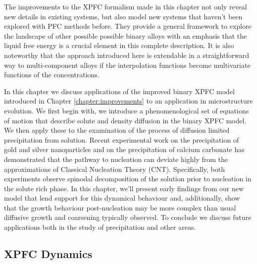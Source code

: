\documentclass[showkeys, prb, reprint]{revtex4-1}
\begin{document}
The improvements to the XPFC formalism made in this chapter not only reveal new
details in existing systems, but also model new systems that haven't been
explored with PFC methods before. They provide a general framework to explore
the landscape of other possible possible binary alloys with an emphasis that
the liquid free energy is a crucial element in this complete description. It is
also noteworthy that the approach introduced here is extendable in a
straightforward way to multi-component alloys if the interpolation functions
become multivariate functions of the concentrations.

In this chapter we discuss applications of the improved binary XPFC model
introduced in Chapter \ref{chapter:improvements} to an application in
microstructure evolution.  We first begin with, we introduce  a
phenomenological set of equations of motion that describe solute and density
diffusion in the binary XPFC model. We then apply these to the examination of
the process of diffusion limited precipitation from solution.  Recent
experimental work on the precipitation of gold and silver nanoparticles
\cite{LOH17} and on the precipitation of calcium carbonate \cite{WALLACE13} has
demonstrated that the pathway to nucleation can deviate highly from the
approximations of Classical Nucleation Theory (CNT).  Specifically, both
experiments observe spinodal decomposition of the solution prior to nucleation
in the solute rich phase. In this chapter, we'll present early findings from
our new model that lend support for this dynamical behaviour and, additionally,
show that the growth behaviour post-nucleation may be more complex than usual
diffusive growth and coarsening typically observed.  To conclude we discuss
future applications both in the study of precipitation and other areas.

\subsection{XPFC Dynamics} %
\end{document}
